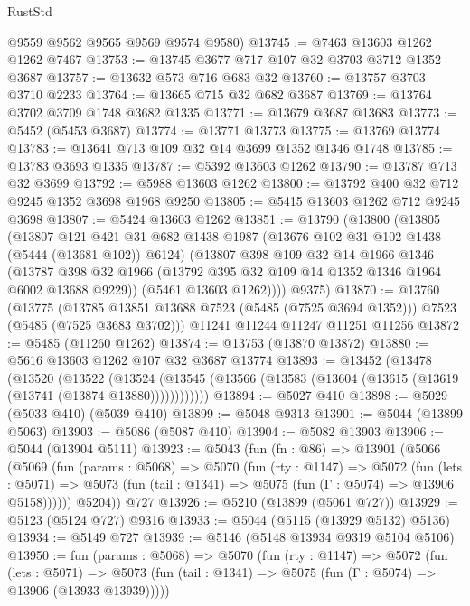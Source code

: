 \begin{lexlean}{RustStd}
\begin{coremodule}
      @9559
      @9562
      @9565
      @9569
      @9574
      @9580)
@13745 := @7463 @13603 @1262 @1262 @7467
@13753 := @13745 @3677 @717 @107 @32 @3703 @3712 @1352 @3687
@13757 := @13632 @573 @716 @683 @32
@13760 := @13757 @3703 @3710 @2233
@13764 := @13665 @715 @32 @682 @3687
@13769 := @13764 @3702 @3709 @1748 @3682 @1335
@13771 := @13679 @3687 @13683
@13773 := @5452 (@5453 @3687)
@13774 := @13771 @13773
@13775 := @13769 @13774
@13783 := @13641 @713 @109 @32 @14 @3699 @1352 @1346 @1748
@13785 := @13783 @3693 @1335
@13787 := @5392 @13603 @1262
@13790 := @13787 @713 @32 @3699
@13792 := @5988 @13603 @1262
@13800 := @13792 @400 @32 @712 @9245 @1352 @3698 @1968 @9250
@13805 := @5415 @13603 @1262 @712 @9245 @3698
@13807 := @5424 @13603 @1262
@13851 := @13790
    (@13800
      (@13805
        (@13807
          @121
          @421
          @31
          @682
          @1438
          @1987
          (@13676 @102 @31 @102 @1438 (@5444 (@13681 @102)) @6124)
          (@13807
            @398
            @109
            @32
            @14
            @1966
            @1346
            (@13787 @398 @32 @1966 (@13792 @395 @32 @109 @14 @1352 @1346 @1964 @6002 @13688 @9229))
            (@5461 @13603 @1262))))
      @9375)
@13870 := @13760
    (@13775
      (@13785 @13851 @13688 @7523 (@5485 (@7525 @3694 @1352)))
      @7523
      (@5485 (@7525 @3683 @3702)))
    @11241
    @11244
    @11247
    @11251
    @11256
@13872 := @5485 (@11260 @1262)
@13874 := @13753 (@13870 @13872)
@13880 := @5616 @13603 @1262 @107 @32 @3687 @13774
@13893 := @13452
    (@13478
      (@13520
        (@13522
          (@13524 (@13545 (@13566 (@13583 (@13604 (@13615 (@13619 (@13741 (@13874 @13880))))))))))))
@13894 := @5027 @410
@13898 := @5029 (@5033 @410) (@5039 @410)
@13899 := @5048 @9313
@13901 := @5044 (@13899 @5063)
@13903 := @5086 (@5087 @410)
@13904 := @5082 @13903
@13906 := @5044 (@13904 @5111)
@13923 := @5043
    (fun (fn : @86) =>
    @13901
      (@5066
        (@5069
          (fun (params : @5068) =>
          @5070
            (fun (rty : @1147) =>
            @5072
              (fun (lets : @5071) =>
              @5073 (fun (tail : @1341) => @5075 (fun (Γ : @5074) => @13906 @5158))))))
        @5204))
    @727
@13926 := @5210 (@13899 (@5061 @727))
@13929 := @5123 (@5124 @727) @9316
@13933 := @5044 (@5115 (@13929 @5132) @5136)
@13934 := @5149 @727
@13939 := @5146 (@5148 @13934 @9319 @5104 @5106)
@13950 := fun (params : @5068) =>
  @5070
    (fun (rty : @1147) =>
    @5072
      (fun (lets : @5071) =>
      @5073 (fun (tail : @1341) => @5075 (fun (Γ : @5074) => @13906 (@13933 @13939)))))

\end{coremodule}
\end{lexlean}

